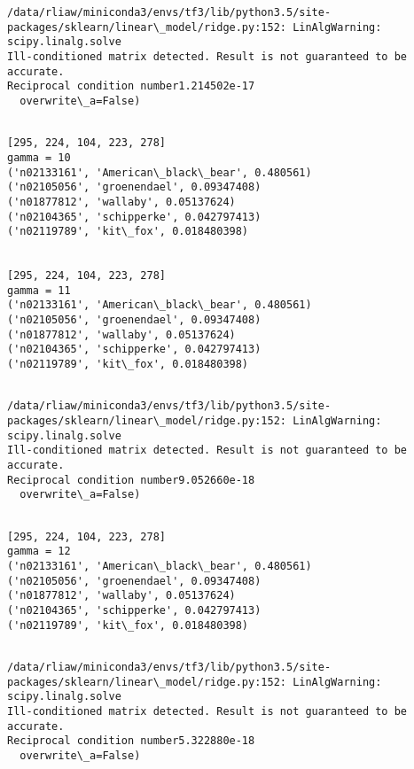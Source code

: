 \documentclass[11pt]{article}
\begin{document}
    \begin{Verbatim}[commandchars=\\\{\}]
/data/rliaw/miniconda3/envs/tf3/lib/python3.5/site-packages/sklearn/linear\_model/ridge.py:152: LinAlgWarning: scipy.linalg.solve
Ill-conditioned matrix detected. Result is not guaranteed to be accurate.
Reciprocal condition number1.214502e-17
  overwrite\_a=False)

    \end{Verbatim}

    \begin{Verbatim}[commandchars=\\\{\}]

[295, 224, 104, 223, 278]
gamma = 10
('n02133161', 'American\_black\_bear', 0.480561)
('n02105056', 'groenendael', 0.09347408)
('n01877812', 'wallaby', 0.05137624)
('n02104365', 'schipperke', 0.042797413)
('n02119789', 'kit\_fox', 0.018480398)


[295, 224, 104, 223, 278]
gamma = 11
('n02133161', 'American\_black\_bear', 0.480561)
('n02105056', 'groenendael', 0.09347408)
('n01877812', 'wallaby', 0.05137624)
('n02104365', 'schipperke', 0.042797413)
('n02119789', 'kit\_fox', 0.018480398)


    \end{Verbatim}

    \begin{Verbatim}[commandchars=\\\{\}]
/data/rliaw/miniconda3/envs/tf3/lib/python3.5/site-packages/sklearn/linear\_model/ridge.py:152: LinAlgWarning: scipy.linalg.solve
Ill-conditioned matrix detected. Result is not guaranteed to be accurate.
Reciprocal condition number9.052660e-18
  overwrite\_a=False)

    \end{Verbatim}

    \begin{Verbatim}[commandchars=\\\{\}]

[295, 224, 104, 223, 278]
gamma = 12
('n02133161', 'American\_black\_bear', 0.480561)
('n02105056', 'groenendael', 0.09347408)
('n01877812', 'wallaby', 0.05137624)
('n02104365', 'schipperke', 0.042797413)
('n02119789', 'kit\_fox', 0.018480398)


    \end{Verbatim}

    \begin{Verbatim}[commandchars=\\\{\}]
/data/rliaw/miniconda3/envs/tf3/lib/python3.5/site-packages/sklearn/linear\_model/ridge.py:152: LinAlgWarning: scipy.linalg.solve
Ill-conditioned matrix detected. Result is not guaranteed to be accurate.
Reciprocal condition number5.322880e-18
  overwrite\_a=False)

    \end{Verbatim}
\end{document}
